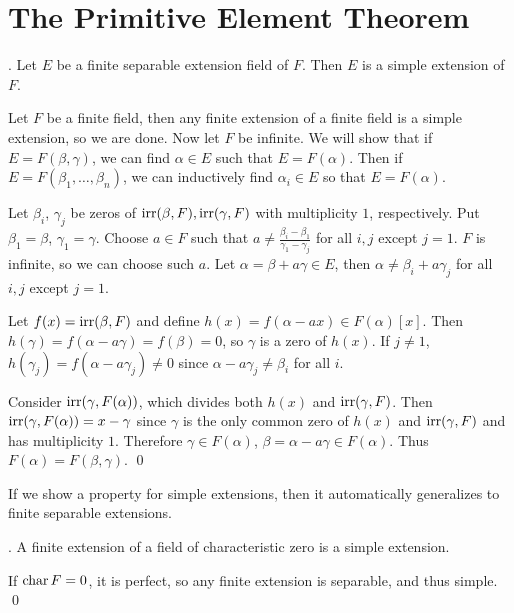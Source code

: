 \section*{The Primitive Element Theorem}

\thm. Let \(E\) be a finite separable extension field of \(F\). Then \(E\) is a simple extension of \(F\).

\pf Let \(F\) be a finite field, then any finite extension of a finite field is a simple extension, so we are done. Now let \(F\) be infinite. We will show that if \(E = F(\beta, \gamma)\), we can find \(\alpha \in E\) such that \(E = F(\alpha)\). Then if \(E = F(\beta_1, \dots, \beta_n)\), we can inductively find \(\alpha_i \in E\) so that \(E = F(\alpha)\).

Let \(\beta_i\), \(\gamma_j\) be zeros of \(\mathrm{irr}(\beta, F), \mathrm{irr}(\gamma, F)\) with multiplicity \(1\), respectively. Put \(\beta_1 = \beta\), \(\gamma_1 = \gamma\). Choose \(a \in F\) such that \(a \neq \frac{\beta_i - \beta_1}{\gamma_1 - \gamma_j}\) for all \(i, j\) except \(j = 1\). \(F\) is infinite, so we can choose such \(a\). Let \(\alpha = \beta + a\gamma \in E\), then \(\alpha \neq \beta_i + a\gamma_j\) for all \(i, j\) except \(j = 1\).

Let \(f(x) = \mathrm{irr}(\beta, F)\) and define \(h(x) = f(\alpha - ax) \in F(\alpha)[x]\). Then \(h(\gamma) = f(\alpha - a\gamma) = f(\beta) = 0\), so \(\gamma\) is a zero of \(h(x)\). If \(j \neq 1\), \(h(\gamma_j) = f(\alpha - a\gamma_j) \neq 0\) since \(\alpha - a\gamma_j \neq \beta_i\) for all \(i\).

Consider \(\mathrm{irr}(\gamma, F(\alpha))\), which divides both \(h(x)\) and \(\mathrm{irr}(\gamma, F)\). Then \(\mathrm{irr}(\gamma, F(\alpha)) = x - \gamma\) since \(\gamma\) is the only common zero of \(h(x)\) and \(\mathrm{irr}(\gamma, F)\) and has multiplicity \(1\). Therefore \(\gamma \in F(\alpha)\), \(\beta = \alpha - a\gamma \in F(\alpha)\). Thus \(F(\alpha) = F(\beta, \gamma)\). \qed

If we show a property for simple extensions, then it automatically generalizes to finite separable extensions.

\cor. A finite extension of a field of characteristic zero is a simple extension.

\pf If \(\operatorname{char} F = 0\), it is perfect, so any finite extension is separable, and thus simple. \qed

\pagebreak

\setcounter{topic}{52}

